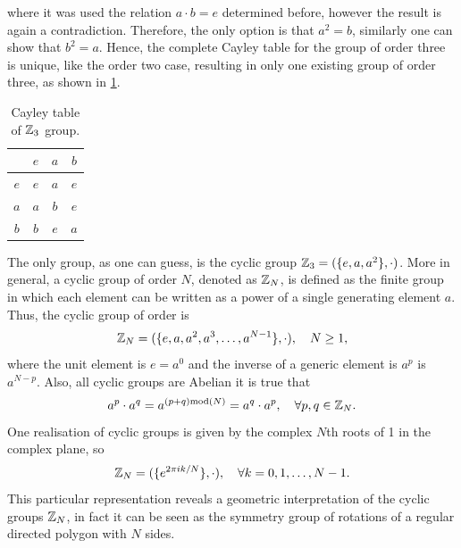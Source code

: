 where it was used the relation $a\cdot b = e$ determined before, however the result is again a contradiction. Therefore, the only option is that $a^2 = b$, similarly one can show that $b^2 = a$. Hence, the complete Cayley table for the group of order three is unique, like the order two case, resulting in only one existing group of order three, as shown in \ref{tab: Z3 Cayley table}.
\begin{table}[h]
    \centering
    \begin{tabular}{|c|ccc|}
        \hline 
         & $e$ & $a$ & $b$ \\ \hline
         $e$ & $e$ & $a$ & $e$ \\ 
         $a$ & $a$ & $b$ & $e$ \\ 
         $b$ & $b$ & $e$ & $a$ \\ \hline
    \end{tabular}
    \caption{Cayley table of $\mathbb{Z}_3$ group.}
    \label{tab: Z3 Cayley table}
\end{table}

The only group, as one can guess, is the cyclic group $\mathbb{Z}_3 = (\{e, a, a^2\},\cdot)$. More in general, a cyclic group of order $N$, denoted as $\mathbb{Z}_N$, is defined as the finite group in which each element can be written as a power of a single generating element $a$. Thus, the cyclic group of order is
\begin{equation}
    \mathbb{Z}_N = (\{e,a,a^2,a^3,\dots,a^{N-1}\},\cdot),\quad N \ge 1,
\end{equation}
where the unit element is $e = a^0$ and the inverse of a generic element is $a^p$ is $a^{N - p}$. Also, all cyclic groups are Abelian it is true that
\begin{equation}
    a^p \cdot a^q = a^{(p + q)\mathrm{mod}(N)} = a^q \cdot a^p,\quad\forall p,q \in \mathbb{Z}_N.
\end{equation}
One realisation of cyclic groups is given by the complex $N$th roots of 1 in the complex plane, so 
\begin{equation}
    \mathbb{Z}_N = (\{e^{2\pi ik/N}\},\cdot),\quad \forall k = 0,1,\dots,N-1.
\end{equation}
This particular representation reveals a geometric interpretation of the cyclic groups $\mathbb{Z}_N$, in fact it can be seen as the symmetry group of rotations of a regular directed polygon with $N$ sides.

